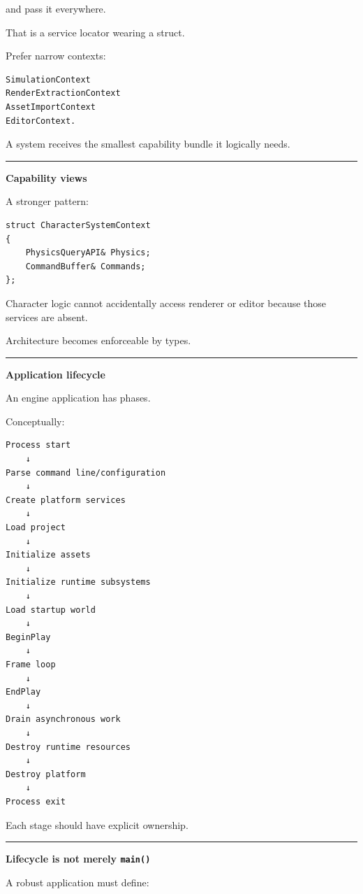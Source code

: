 and pass it everywhere.

That is a service locator wearing a struct.

Prefer narrow contexts:

\begin{verbatim}
SimulationContext
RenderExtractionContext
AssetImportContext
EditorContext.
\end{verbatim}

A system receives the smallest capability bundle it logically needs.

\begin{center}\rule{0.5\linewidth}{0.5pt}\end{center}

\textbf{Capability views}

A stronger pattern:

\begin{verbatim}
struct CharacterSystemContext
{
    PhysicsQueryAPI& Physics;
    CommandBuffer& Commands;
};
\end{verbatim}

Character logic cannot accidentally access renderer or editor because those services are absent.

Architecture becomes enforceable by types.

\begin{center}\rule{0.5\linewidth}{0.5pt}\end{center}

\textbf{Application lifecycle}

An engine application has phases.

Conceptually:

\begin{verbatim}
Process start
    ↓
Parse command line/configuration
    ↓
Create platform services
    ↓
Load project
    ↓
Initialize assets
    ↓
Initialize runtime subsystems
    ↓
Load startup world
    ↓
BeginPlay
    ↓
Frame loop
    ↓
EndPlay
    ↓
Drain asynchronous work
    ↓
Destroy runtime resources
    ↓
Destroy platform
    ↓
Process exit
\end{verbatim}

Each stage should have explicit ownership.

\begin{center}\rule{0.5\linewidth}{0.5pt}\end{center}

\textbf{Lifecycle is not merely \texttt{main()}}

A robust application must define:

